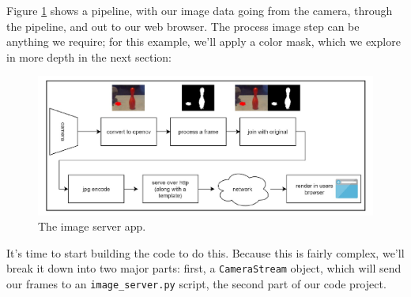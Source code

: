 Figure \ref{server_app} shows a pipeline, with our image data going from the camera,
through the pipeline, and out to our web browser. The process image step can be anything
we require; for this example, we'll apply a color mask, which we explore in more depth in
the next section:

\begin{figure}[!htb]
\begin{center}
\includegraphics[scale=0.280]{img/raspberrypi/server_app.jpeg}
\end{center}
\caption{The image server app.}
\label{server_app}
\end{figure}

It's time to start building the code to do this. Because this is fairly complex, we'll break it
down into two major parts: first, a \lstinline{CameraStream} object, which will send our frames to an
\lstinline{image_server.py} script, the second part of our code project.





